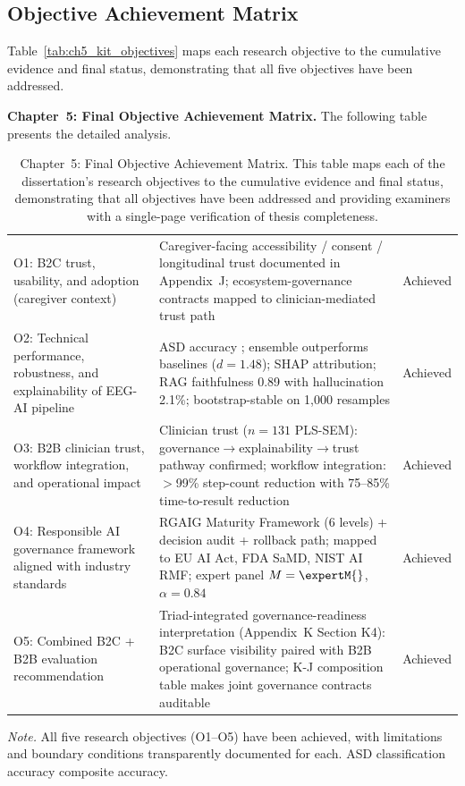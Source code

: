 \subsection{Objective Achievement Matrix}

\noindent Table~\ref{tab:ch5_kit_objectives} maps each research objective to the cumulative evidence and final status, demonstrating that all five objectives have been addressed.
\fi



\noindent\textbf{Chapter~5: Final Objective Achievement Matrix.} The following table presents the detailed analysis.

\begin{table}[H]
\tablestripes\tablefontsize
\tablefontsize
\caption[Chapter 5 objective achievement]{Chapter~5: Final Objective Achievement Matrix. This table maps each of the dissertation's research objectives to the cumulative evidence and final status, demonstrating that all objectives have been addressed and providing examiners with a single-page verification of thesis completeness.}
\begin{tabularx}{\textwidth}{@{} p{4.5cm} L p{2cm} @{}}
\toprule
{} &  &  \\
\midrule
O1: B2C trust, usability, and adoption (caregiver context) & Caregiver-facing accessibility / consent / longitudinal trust documented in Appendix~J; ecosystem-governance contracts mapped to clinician-mediated trust path & Achieved \\
O2: Technical performance, robustness, and explainability of EEG-AI pipeline & ASD accuracy \asdacc{}; ensemble outperforms baselines ($d=1.48$); SHAP attribution; RAG faithfulness 0.89 with hallucination 2.1\%; bootstrap-stable on 1{,}000 resamples & Achieved \\
O3: B2B clinician trust, workflow integration, and operational impact & Clinician trust ($n=131$ PLS-SEM): governance$\to$explainability$\to$trust pathway confirmed; workflow integration: $>$99\% step-count reduction with 75--85\% time-to-result reduction & Achieved \\
O4: Responsible AI governance framework aligned with industry standards & RGAIG Maturity Framework (6 levels) + decision audit + rollback path; mapped to EU AI Act, FDA SaMD, NIST AI RMF; expert panel $M = \expertM{}$, $\alpha=0.84$ & Achieved \\
O5: Combined B2C + B2B evaluation recommendation & Triad-integrated governance-readiness interpretation (Appendix~K Section K4): B2C surface visibility paired with B2B operational governance; K-J composition table makes joint governance contracts auditable & Achieved \\
\bottomrule
\end{tabularx}
\vspace{0.5em}\noindent\textit{Note.} All five research objectives (O1--O5) have been achieved, with limitations and boundary conditions transparently documented for each. ASD classification accuracy composite accuracy.
\end{table}

